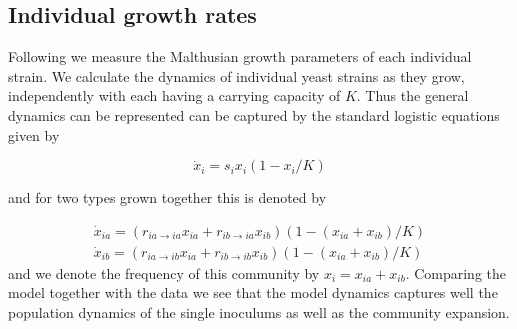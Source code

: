 \subsection{Individual growth rates}

Following \citep{lenski:AmNat:1991} we measure the Malthusian growth parameters of each individual strain.
We calculate the dynamics of individual yeast strains as they grow, independently with each having a carrying capacity of $K$.
Thus the general dynamics can be represented can be captured by the standard logistic equations given by

\begin{equation}
	\dot{x}_i = s_i x_i (1 - x_i/K) 
\end{equation}

and for two types grown together this is denoted by

\begin{eqnarray}
	\dot{x}_{ia} = (r_{ia \rightarrow ia } x_{ia} + r_{ib \rightarrow ia } x_{ib})  (1 - (x_{ia}+x_{ib})/K) \nonumber \\
	\dot{x}_{ib} = (r_{ia \rightarrow ib } x_{ia} + r_{ib \rightarrow ib } x_{ib}) (1 - (x_{ia}+x_{ib})/K)
\end{eqnarray}
and we denote the frequency of this community by $x_i = x_{ia} + x_{ib}$.
Comparing the model together with the data we see that the model dynamics captures well the population dynamics of the single inoculums as well as the community expansion.